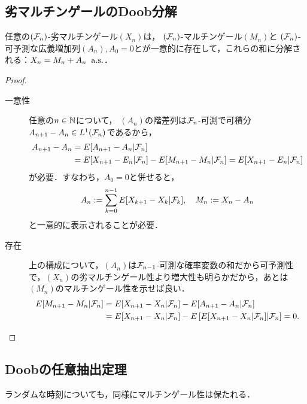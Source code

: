 \documentclass[uplatex,dvipdfmx]{jsreport}
\begin{document}
\subsection{劣マルチンゲールのDoob分解}

\begin{theorem}
    任意の$(\mathcal{F}_n)$-劣マルチンゲール$(X_n)$は，
    $(\mathcal{F}_n)$-マルチンゲール$(M_n)$と
    $(\mathcal{F}_n)$-可予測な広義増加列$(A_n),A_0=0$とが一意的に存在して，これらの和に分解される：$X_n=M_n+A_n\;\;\mathrm{a.s.}$．
\end{theorem}
\begin{proof}\mbox{}
    \begin{description}
        \item[一意性] 任意の$n\in\mathbb{N}$について，
        $(A_n)$の階差列は$\mathcal{F}_n$-可測で可積分$A_{n+1}-A_n\in L^1(\mathcal{F}_n)$であるから，
        \begin{align*}
            A_{n+1}-A_n&=E[A_{n+1}-A_n|\mathcal{F}_n]\\
            &=E[X_{n+1}-E_n|\mathcal{F}_n]-E[M_{n+1}-M_n|\mathcal{F}_n]=E[X_{n+1}-E_n|\mathcal{F}_n]
        \end{align*}
        が必要．すなわち，$A_0=0$と併せると，
        \[A_n:=\sum_{k=0}^{n-1}E[X_{k+1}-X_k|\mathcal{F}_k],\quad M_n:=X_n-A_n\]
        と一意的に表示されることが必要．
        \item[存在] 上の構成について，$(A_n)$は$\mathcal{F}_{n-1}$-可測な確率変数の和だから可予測性で，$(X_n)$の劣マルチンゲール性より増大性も明らかだから，あとは$(M_n)$のマルチンゲール性を示せば良い．
        \begin{align*}
            E[M_{n+1}-M_n|\mathcal{F}_n]&=E[X_{n+1}-X_n|\mathcal{F}_n]-E[A_{n+1}-A_n|\mathcal{F}_n]\\
            &=E[X_{n+1}-X_n|\mathcal{F}_n]-E\left[E[X_{n+1}-X_n|\mathcal{F}_n]|\mathcal{F}_n\right]=0.
        \end{align*}
    \end{description}
\end{proof}

\subsection{Doobの任意抽出定理}

\begin{tcolorbox}[colframe=ForestGreen, colback=ForestGreen!10!white,breakable,colbacktitle=ForestGreen!40!white,coltitle=black,fonttitle=\bfseries\sffamily,
title=]
    ランダムな時刻についても，同様にマルチンゲール性は保たれる．
\end{tcolorbox}
\end{document}
